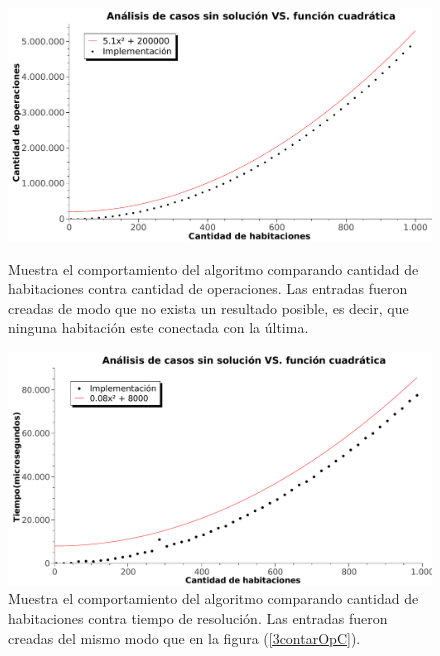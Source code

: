 \begin{figure}[htb]
    \begin{minipage}{\textwidth}
	\begin{center}
		\includegraphics[width=\textwidth]{../ej3/graficos/3_ej_contarOperacionesC.pdf}
		\caption{Muestra el comportamiento del algoritmo comparando cantidad de habitaciones contra cantidad de operaciones. Las entradas fueron creadas de modo que no exista un resultado posible, es decir, que ninguna habitación este conectada con la última.}
		\label{3contarOpC}
	\end{center}
    \end{minipage}

    \begin{minipage}{\textwidth}
	\begin{center}
		\includegraphics[width=\textwidth]{../ej3/graficos/3_ej_contarTiempoC.pdf}
		\caption{Muestra el comportamiento del algoritmo comparando cantidad de habitaciones contra tiempo de resolución. Las entradas fueron creadas del mismo modo que en la figura (\ref{3contarOpC}).}
		\label{3contarTiempoC}
	\end{center}
    \end{minipage}

\end{figure}

